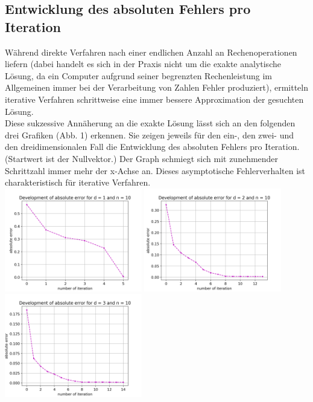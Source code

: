\documentclass{scrartcl}
\begin{document}
\subsection{Entwicklung des absoluten Fehlers pro Iteration}
Während direkte Verfahren nach einer endlichen Anzahl an Rechenoperationen \grqq{} liefern (dabei handelt es sich in der Praxis nicht um die exakte analytische Lösung, da ein Computer aufgrund seiner begrenzten Rechenleistung im Allgemeinen immer bei der Verarbeitung von Zahlen Fehler produziert), ermitteln iterative Verfahren schrittweise eine immer bessere Approximation der gesuchten Lösung. \\ 
Diese sukzessive Annäherung an die exakte Lösung lässt sich an den folgenden drei Grafiken (Abb. 1) erkennen. 
Sie zeigen jeweils für den ein-, den zwei- und den dreidimensionalen Fall die Entwicklung des absoluten Fehlers pro Iteration. 
(Startwert ist der Nullvektor.) 
Der Graph schmiegt sich mit zunehmender Schrittzahl immer mehr der x-Achse an. 
Dieses asymptotische Fehlerverhalten ist charakteristisch für iterative Verfahren. \\

{
  \centering
    \includegraphics[width=0.45\textwidth]{Grafiken/iterates_d1_n10}
    \includegraphics[width=0.45\textwidth]{Grafiken/iterates_d2_n10}
    \includegraphics[width=0.45\textwidth]{Grafiken/iterates_d3_n10}
    \vspace{-0.2cm}
}
\vspace{0.5cm}
\end{document}
